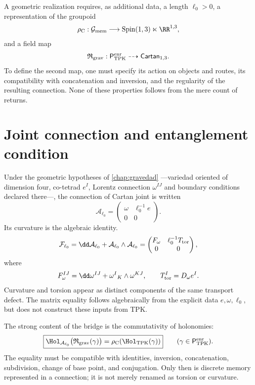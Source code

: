 A geometric realization requires, as additional data, a length
\(\ell_0>0\), a representation of the groupoid
\[
 \rho_{\rm C}:
 \mathcal G_{\rm mem}
 \longrightarrow
 \operatorname{Spin}(1,3)\ltimes\RR^{1,3},
\]
and a field map
\[
 \mathfrak R_{\rm grav}:
 \mathsf P_{\rm TPK}^{\rm enr}
 \dashrightarrow
 \mathsf{Cartan}_{1,3}.
\]
To define the second map, one must specify its action on objects and
routes, its compatibility with concatenation and inversion, and the regularity of the
resulting connection. None of these properties follows from the mere count
of returns.

\section{Joint connection and entanglement condition}
\label{sec:conexion-cartan-conjunta}

Under the geometric hypotheses of \cref{chap:gravedad} ---variedad
oriented of dimension four, co-tetrad \(e^I\), Lorentz connection
\(\omega^{IJ}\) and boundary conditions declared there---, the connection of
Cartan joint is written
\[
 \mathcal A_{\ell_0}
 =
 \begin{pmatrix}
  \omega&\ell_0^{-1}e\\
  0&0
 \end{pmatrix}.
\]
Its curvature is the algebraic identity.
\[
 \mathcal F_{\ell_0}
 =\dd\mathcal A_{\ell_0}
  +\mathcal A_{\ell_0}\wedge\mathcal A_{\ell_0}
 =
 \begin{pmatrix}
  F_\omega&\ell_0^{-1}T_{\rm tor}\\
  0&0
 \end{pmatrix},
\]
where
\[
 F_\omega^{IJ}
 =\dd\omega^{IJ}+\omega^I{}_K\wedge\omega^{KJ},
 \qquad
 T_{\rm tor}^{I}=D_\omega e^I.
\]
Curvature and torsion appear as distinct components of the same
transport defect. The matrix equality follows algebraically from the
explicit data \(e,\omega,\ell_0\), but does not construct these inputs from TPK.

The strong content of the bridge is the commutativity of holonomies:
\[
 \boxed{
 \Hol_{\mathcal A_{\ell_0}}
 \bigl(\mathfrak R_{\rm grav}(\gamma)\bigr)
 =
 \rho_{\rm C}\!\left(
 \Hol_{\rm TPK}(\gamma)
 \right)}
 \qquad
 (\gamma\in\mathsf P_{\rm TPK}^{\rm enr}).
\]
The equality must be compatible with identities, inversion, concatenation,
subdivision, change of base point, and conjugation. Only then is discrete
memory represented in a connection; it is not merely renamed as
torsion or curvature.

